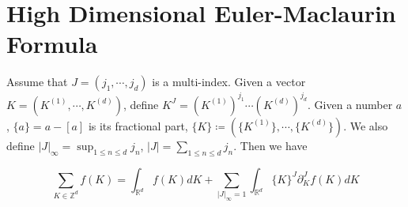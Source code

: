 

\section{High Dimensional Euler-Maclaurin Formula}

\begin{thm}
Assume that $J=(j_1,\cdots,j_d)$ is a multi-index. Given a vector $K=(K^{(1)},\cdots,K^{(d)})$, define $K^J=\left(K^{(1)}\right)^{j_1}\cdots\left(K^{(d)}\right)^{j_d}$. Given a number $a$, $\{a\}=a-[a]$ is its fractional part, $\{K\}\coloneq(\{K^{(1)}\},\cdots,\{K^{(d)}\})$. We also define $|J|_{\infty}=\sup_{1\le n\le d} j_{n}$, $|J|=\sum_{1\le n\le d} j_{n}$. Then we have

\begin{equation}\label{eq.EulerMaclaurin}
    \sum_{K\in\mathbb{Z}^d} f(K)=\int_{\mathbb{R}^d} f(K)dK+\sum_{ |J|_{\infty} = 1}\int_{\mathbb{R}^d} \{K\}^{J} \partial_K^{J}f(K) dK
\end{equation}

\end{thm}
